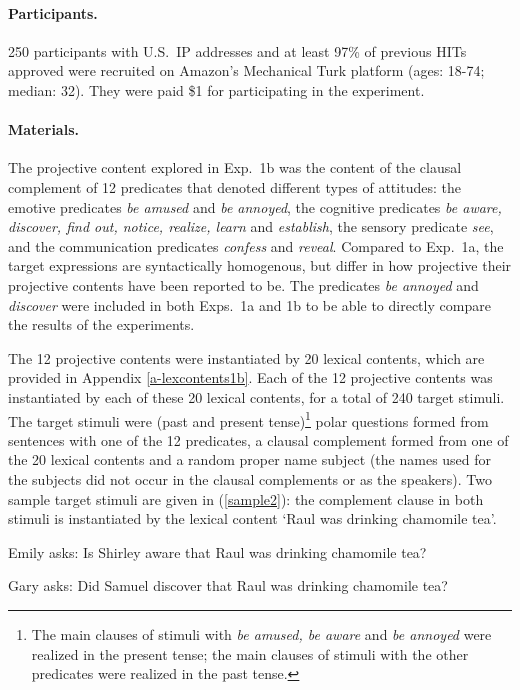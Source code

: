 \documentclass[11pt,fleqn]{article}
\newcommand{\6}{\mbox{$[\hspace*{-.6mm}[$}}
\newcommand{\9}{\mbox{$]\hspace*{-.6mm}]$}}
\begin{document}

\paragraph{Participants.} 250 participants with U.S.\ IP addresses and at least 97\% of previous HITs approved were recruited on Amazon's Mechanical Turk platform (ages: 18-74; median: 32). They were paid \$1 for participating in the experiment.

\paragraph{Materials.} The projective content explored in Exp.~1b was the content of the clausal complement of 12 predicates that denoted different types of attitudes: the emotive predicates {\em be amused} and {\em be annoyed}, the cognitive predicates {\em be aware, discover, find out, notice, realize, learn} and {\em establish}, the sensory predicate {\em see}, and the communication predicates {\em confess} and {\em reveal}. Compared to Exp.~1a, the target expressions are syntactically homogenous, but differ in how projective their projective contents have been reported to be. The predicates {\em be annoyed} and {\em discover} were included in both Exps.~1a and 1b to be able to directly compare the results of the experiments.

The 12 projective contents were instantiated by 20 lexical contents, which are provided in Appendix \ref{a-lexcontents1b}.  Each of the 12 projective contents was instantiated by each of these 20 lexical contents, for a total of 240 target stimuli. The target stimuli were (past and present tense)\footnote{The main clauses of stimuli with {\em be amused, be aware} and {\em be annoyed} were realized in the present tense; the main clauses of stimuli with the other predicates were realized in the past tense.} polar questions formed from sentences with one of the 12 predicates, a clausal complement formed from one of the 20 lexical contents and a random proper name subject (the names used for the subjects did not occur in the clausal complements or as the speakers). Two sample target stimuli are given in (\ref{sample2}): the complement clause in both stimuli is instantiated by the lexical content `Raul was drinking chamomile tea'.

\begin{exe}
\ex\label{sample2}
\begin{xlist}
\ex Emily asks: Is Shirley aware that Raul was drinking chamomile tea?

\ex Gary asks: Did Samuel discover that Raul was drinking chamomile tea?
\end{xlist}
\end{exe}
\end{document}
